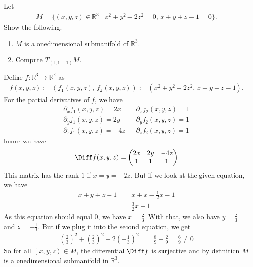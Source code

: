 \begin{question}
    Let
    \begin{align}
        M = \{ (x, y, z) \in \mathbb{R}^3 \mid x^2 + y^2 - 2z^2 = 0, \, x + y + z - 1 = 0\} \text{.}
    \end{align}
    Show the following.
    \begin{enumerate}
        \item \(M\) is a onedimensional submanifold of \(\mathbb{R}^3\).
        \item Compute \(T_{(1, 1, -1)}M\).
    \end{enumerate}
\end{question}
\begin{solution}
    Define \(f: \mathbb{R}^3 \rightarrow \mathbb{R}^2\) as
    \begin{align}
        f(x, y, z) := (f_1(x, y, z), \, f_2(x, y, z)):= (x^2 + y^2 - 2z^2, \, x + y + z - 1) \text{.}
    \end{align}
    For the partial derivatives of \(f\), we have
    \begin{align}
        \partial_x f_1(x, y , z) = 2x && \partial_x f_2(x, y, z) = 1 \\
        \partial_y f_1(x, y, z) = 2y && \partial_y f_2(x, y, z) = 1 \\
        \partial_z f_1(x, y, z) = -4z && \partial_z f_2(x, y, z) = 1
    \end{align}
    hence we have
    \begin{align}
        \Diff f (x, y, z) = \begin{pmatrix}
            2x & 2y & -4z \\
            1 & 1 & 1
        \end{pmatrix}
    \end{align}
    This matrix has the rank \(1\) if \(x = y = -2z\). But if we look at the given equation, we have
    \begin{align}
        x + y + z - 1 &= x + x - \frac{1}{2}x - 1 \\
        &= \frac{3}{2} x - 1
    \end{align}
    As this equation should equal \(0\), we have \(x = \frac{2}{3}\). With that, we also have \(y = \frac{2}{3}\) and \(z = -\frac{1}{3}\). But if we plug it into the second equation, we get
    \begin{align}
        (\frac{2}{3})^2 + (\frac{2}{3})^2 - 2 (-\frac{1}{3})^2 &= \frac{8}{9} - \frac{2}{9} = \frac{6}{9} \neq 0
    \end{align}
    So for all \((x, y, z) \in M\), the differential \(\Diff f\) is surjective and by definition \(M\) is a onedimensional submanifold in \(\mathbb{R}^3\).
\end{solution}
